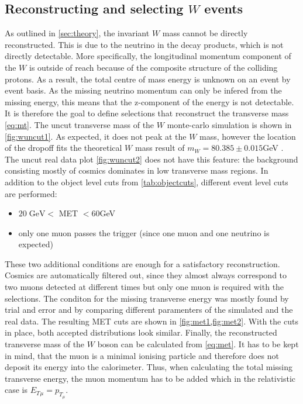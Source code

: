 \documentclass[twoside,        %
               BCOR12mm,       %
               ngerman,english, %
               fleqn,headsepline=false,footsepline=false
              ]{Vorlage/MFPREPORT}
\begin{document}
\subsection{Reconstructing and selecting $W$ events}
As outlined in \cref{sec:theory}, the invariant $W$ mass cannot be directly
reconstructed. This is due to the neutrino in the decay products, which is not
directly detectable. More specifically, the longitudinal momentum component of the $W$ is
outside of reach because of the composite structure of the colliding protons.
As a result, the total centre of mass energy is unknown on an event by event
basis. As the missing neutrino momentum can only be infered from the missing energy,
this means that the z-component of the energy is not detectable.
It is therefore the goal to define selections that reconstruct the transverse
mass \cref{eq:mt}. The uncut transverse mass of the $W$ monte-carlo simulation
is shown in \cref{fig:wuncut1}. As expected, it does not peak at the $W$ mass,
however the location of the dropoff fits the theoretical $W$ mass result of
$m_W=80.385\pm0.015$\;GeV \cite{pdataz}. The uncut real data plot
\cref{fig:wuncut2} does not have this feature: the background consisting mostly
of cosmics dominates in low transverse mass regions. In addition to the
object level cuts from \cref{tab:objectcuts}, different event level cuts are
performed:
\begin{itemize}
    \item $20\;\text{GeV}<$ MET $<60$\;GeV
    \item only one muon passes the trigger (since one muon and one neutrino is
        expected)
\end{itemize}
These two additional conditions are enough for a satisfactory reconstruction.
Cosmics are automatically filtered out, since they almost always correspond to
two muons detected at different times but only one muon is required with the
selections. The conditon for the missing transverse energy was mostly found by
trial and error and by comparing different paramenters of the simulated and the
real data. The resulting MET cuts are shown in \cref{fig:met1,fig:met2}. With
the cuts in place, both accepted distributions look similar.
Finally, the reconstructed transverse mass of the $W$ boson can be calculated
from \cref{eq:met}. It has to be kept in mind, that the muon is a minimal
ionising particle and therefore does not deposit its energy into the
calorimeter. Thus, when calculating the total missing transverse energy, the muon
momentum has to be added which in the relativistic case is
$E_T{_{\mu}}=p_{T_\mu}$. 
\end{document}
